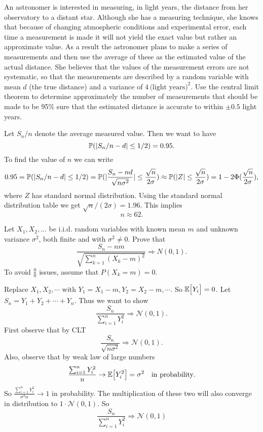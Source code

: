 \begin{problem}
	An astronomer is interested in measuring, in light years, the distance from her observatory to a distant star. Although she has a measuring technique, she knows that because of changing atmospheric conditions and experimental error, each time a measurement is made it will not yield the exact value but rather an approximate value. As a result the astronomer plans to make a series of measurements and then use the average of these as the estimated value of the actual distance. She believes that the values of the measurement errors are not systematic, so that the measurements are described by a random variable with mean \( d \) (the true distance) and a variance of \( 4 \, \text{(light years)}^2 \). Use the central limit theorem to determine approximately the number of measurements that should be made to be 95\% sure that the estimated distance is accurate to within \( \pm 0.5 \) light years.
\end{problem}
\begin{solution}
	Let $ S_n/n $ denote the average measured value. Then we want to have
	\[ \mathbb{P}(|S_n/n - d| \leq 1/2) = 0.95. \]
	To find the value of $ n $ we can write
	\begin{align*}
		0.95 = \mathbb{P}(|S_n/n -d| \leq 1/2) = \mathbb{P}(|\frac{S_n - nd}{\sqrt{n\sigma^2}}| \leq \frac{\sqrt{n}}{2\sigma}) \approx \mathbb{P}(|Z|\leq \frac{\sqrt{n}}{2\sigma}) = 1 - 2 \Phi(\frac{\sqrt{n}}{2\sigma}),
	\end{align*}
	where $ Z $ has standard normal distribution. Using the standard normal distribution table we get $ \sqrt{n}/(2\sigma) = 1.96 $. This implies
	\[ n \approx 62.\]
\end{solution}

\begin{problem}
	Let \( X_1, X_2, \dots \) be i.i.d. random variables with known mean \( m \) and unknown variance \( \sigma^2 \), both finite and with \( \sigma^2 \neq 0 \). Prove that
	\[
	\frac{S_n - nm}{\sqrt{\sum_{k=1}^n (X_k - m)^2}} \Rightarrow N(0,1).
	\]
	To avoid \( \frac{0}{0} \) issues, assume that \( P(X_k = m) = 0 \).
\end{problem}
\begin{solution}
	Replace $ X_1,X_2,\cdots $ with $ Y_1 = X_1-m, Y_2=X_2-m,\cdots $. So $ \mathbb{E}\big[Y_i\big] = 0 $. Let $ S_n = Y_1 + Y_2 + \cdots + Y_n $. Thus we want to show 
	\[ \frac{S_n}{\sum_{i=1}^{n}Y_i^2} \Rightarrow \mathcal{N}(0,1). \]
	First observe that by CLT 
	\[ \frac{S_n}{\sqrt{n\sigma^2}} \Rightarrow \mathcal{N}(0,1). \]
	Also, observe that by weak law of large numbers
	\[ \frac{\sum_{i=1}^{n} Y_i^2}{n} \to \mathbb{E}\big[Y_i^2\big] = \sigma^2 \quad \text{in probability}. \]
	So $ \frac{\sum_{i=1}^{n} Y_i^2}{\sigma^2 n} \to 1 $ in probability. The multiplication of these two will also converge in distribution to $ 1\cdot\mathcal{N}(0,1) $. So
	\[ \frac{S_n}{\sum_{i=1}^{n}Y_i^2} \Rightarrow \mathcal{N}(0,1) \]
\end{solution}

